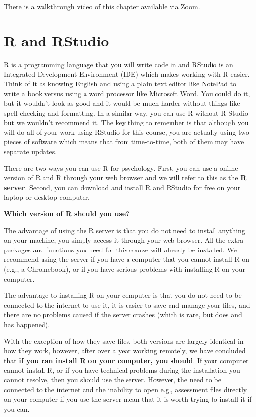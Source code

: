 \documentclass[
  oneside]{book}
\begin{document}
There is a \href{https://uofglasgow.zoom.us/rec/play/z4QocMWQL9ExSfHYBaC8C1oISbrEDkOlz8wJwT0oT2y116hgB0yA0O9cTtVdvYWYqO-wq97Xi8_yncLv.1st2ENKayHb21h0S?autoplay=true\&startTime=1600084596000}{walkthrough video} of this chapter available via Zoom.

\hypertarget{r-and-rstudio}{%
\section{R and RStudio}\label{r-and-rstudio}}

R is a programming language that you will write code in and RStudio is an Integrated Development Environment (IDE) which makes working with R easier. Think of it as knowing English and using a plain text editor like NotePad to write a book versus using a word processor like Microsoft Word. You could do it, but it wouldn't look as good and it would be much harder without things like spell-checking and formatting. In a similar way, you can use R without R Studio but we wouldn't recommend it. The key thing to remember is that although you will do all of your work using RStudio for this course, you are actually using two pieces of software which means that from time-to-time, both of them may have separate updates.

There are two ways you can use R for psychology. First, you can use a online version of R and R through your web browser and we will refer to this as the \textbf{R server}. Second, you can download and install R and RStudio for free on your laptop or desktop computer.

\textbf{Which version of R should you use?}

The advantage of using the R server is that you do not need to install anything on your machine, you simply access it through your web browser. All the extra packages and functions you need for this course will already be installed. We recommend using the server if you have a computer that you cannot install R on (e.g., a Chromebook), or if you have serious problems with installing R on your computer.

The advantage to installing R on your computer is that you do not need to be connected to the internet to use it, it is easier to save and manage your files, and there are no problems caused if the server crashes (which is rare, but does and has happened).

With the exception of how they save files, both versions are largely identical in how they work, however, after over a year working remotely, we have concluded that \textbf{if you can install R on your computer, you should}. If your computer cannot install R, or if you have technical problems during the installation you cannot resolve, then you should use the server. However, the need to be connected to the internet and the inability to open e.g., assessment files directly on your computer if you use the server mean that it is worth trying to install it if you can.
\end{document}
